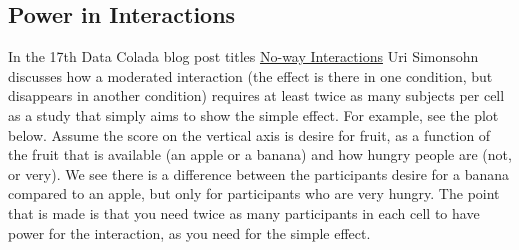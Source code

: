 \documentclass[]{article}
\title{}
\author{}
\date{}
\newenvironment{Shaded}{\begin{snugshade}}{\end{snugshade}}
\newcommand{\KeywordTok}[1]{\textcolor[rgb]{0.13,0.29,0.53}{\textbf{#1}}}
\newcommand{\DataTypeTok}[1]{\textcolor[rgb]{0.13,0.29,0.53}{#1}}
\newcommand{\DecValTok}[1]{\textcolor[rgb]{0.00,0.00,0.81}{#1}}
\newcommand{\StringTok}[1]{\textcolor[rgb]{0.31,0.60,0.02}{#1}}
\newcommand{\CommentTok}[1]{\textcolor[rgb]{0.56,0.35,0.01}{\textit{#1}}}
\newcommand{\OtherTok}[1]{\textcolor[rgb]{0.56,0.35,0.01}{#1}}
\newcommand{\OperatorTok}[1]{\textcolor[rgb]{0.81,0.36,0.00}{\textbf{#1}}}
\newcommand{\NormalTok}[1]{#1}
\begin{document}
\begin{Shaded}
\end{Shaded}

\subsection{Power in Interactions}\label{power-in-interactions}

In the 17th Data Colada blog post titles
\href{http://datacolada.org/17}{No-way Interactions} Uri Simonsohn
discusses how a moderated interaction (the effect is there in one
condition, but disappears in another condition) requires at least twice
as many subjects per cell as a study that simply aims to show the simple
effect. For example, see the plot below. Assume the score on the
vertical axis is desire for fruit, as a function of the fruit that is
available (an apple or a banana) and how hungry people are (not, or
very). We see there is a difference between the participants desire for
a banana compared to an apple, but only for participants who are very
hungry. The point that is made is that you need twice as many
participants in each cell to have power for the interaction, as you need
for the simple effect.
\end{document}
